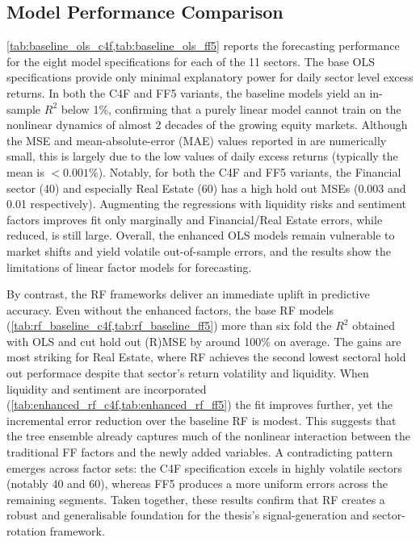  






\subsection{Model Performance Comparison}
\cref{tab:baseline_ols_c4f,tab:baseline_ols_ff5} reports the forecasting performance for the eight model specifications for each of the 11 sectors. The base OLS specifications provide only minimal explanatory power for daily sector level excess returns. In both the C4F and FF5 variants, the baseline models yield an in-sample $R^{2}$ below 1\%, confirming that a purely linear model cannot train on the nonlinear dynamics of almost 2 decades of the growing equity markets. Although the MSE and mean-absolute-error (MAE) values reported in  are numerically small, this is largely due to the low values of daily excess returns (typically the mean is  $<0.001\%$). Notably, for both the C4F and FF5 variants, the Financial sector (40) and especially Real Estate (60) has a high hold out MSEs (0.003 and 0.01 respectively). Augmenting the regressions with liquidity risks and sentiment factors  improves fit only marginally and Financial/Real Estate errors, while reduced, is still large. Overall, the enhanced OLS models remain vulnerable to market shifts and yield volatile out-of-sample errors, and the results show the limitations of linear factor models for forecasting.

By contrast, the RF frameworks deliver an immediate uplift in predictive accuracy. Even without the enhanced factors, the base RF models (\cref{tab:rf_baseline_c4f,tab:rf_baseline_ff5}) more than six fold the $R^{2}$ obtained with OLS and cut hold out (R)MSE by around 100\% on average. The gains are most striking for Real Estate, where RF achieves the second lowest sectoral hold out performace despite that sector's return volatility and liquidity. When liquidity and sentiment are incorporated (\cref{tab:enhanced_rf_c4f,tab:enhanced_rf_ff5}) the fit improves further, yet the incremental error reduction over the baseline RF is modest. This suggests that the tree ensemble already captures much of the nonlinear interaction between the traditional FF factors and the newly added variables. A contradicting pattern emerges across factor sets: the C4F specification excels in highly volatile sectors (notably 40 and 60), whereas FF5 produces a more uniform errors across the remaining segments. Taken together, these results confirm that RF creates a robust and generalisable foundation for the thesis's signal-generation and sector-rotation framework.

